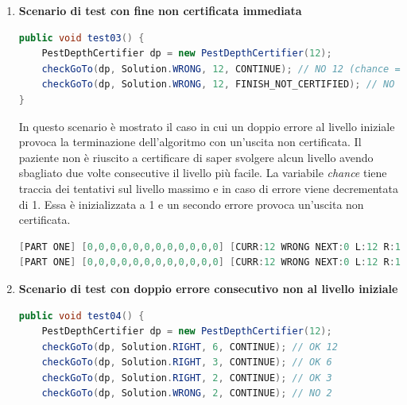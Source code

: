 \documentclass[
	corpo=12pt,
	twoside,
 	evenboxes,
	tipotesi=triennale,
    	stile=classica,
   	 greek,
]{toptesi}
\begin{document}
\begin{enumerate}
\begin{lstlisting}[language=Java, label=lst:debug02, caption={Debug 02}]
[PART ONE] [0,0,0,0,0,0,0,0,0,0,0,1] [CURR:12 RIGHT NEXT:6 L:12 R:1]
[PART ONE] [0,0,0,0,0,1,0,0,0,0,0,1] [CURR:6 RIGHT NEXT:3 L:6 R:1]
[PART ONE] [0,0,1,0,0,1,0,0,0,0,0,1] [CURR:3 RIGHT NEXT:2 L:3 R:1]
[PART ONE] [0,1,1,0,0,1,0,0,0,0,0,1] [CURR:2 RIGHT NEXT:1 L:2 R:1]
[PART TWO] [1,1,1,0,0,1,0,0,0,0,0,1] [CURR:1 RIGHT NEXT:1 L:2 R:1]
[PART TWO] [2,1,1,0,0,1,0,0,0,0,0,1] [CURR:1 RIGHT NEXT:1 L:2 R:1]
\end{lstlisting}

\item \textbf{Scenario di test con fine non certificata immediata}

\begin{lstlisting}[language=Java, label=lst:test03, caption={Test 03}]
public void test03() {
	PestDepthCertifier dp = new PestDepthCertifier(12);
	checkGoTo(dp, Solution.WRONG, 12, CONTINUE); // NO 12 (chance = 0)
	checkGoTo(dp, Solution.WRONG, 12, FINISH_NOT_CERTIFIED); // NO 12, FINISH_NOT_CERTIFIED
}
\end{lstlisting}

In questo scenario è mostrato il caso in cui un doppio errore al livello iniziale provoca la terminazione dell'algoritmo con un'uscita non certificata. Il paziente non è riuscito a certificare di saper svolgere alcun livello avendo sbagliato due volte consecutive il livello più facile. La variabile \textit{chance} tiene traccia dei tentativi sul livello massimo e in caso di errore viene decrementata di 1. Essa è inizializzata a 1 e un secondo errore provoca un’uscita non certificata.

\begin{lstlisting}[language=Java, label=lst:debug03, caption={Debug 03}]
[PART ONE] [0,0,0,0,0,0,0,0,0,0,0,0] [CURR:12 WRONG NEXT:0 L:12 R:1]
[PART ONE] [0,0,0,0,0,0,0,0,0,0,0,0] [CURR:12 WRONG NEXT:0 L:12 R:1]
\end{lstlisting}

\item \textbf{Scenario di test con doppio errore consecutivo non al livello iniziale}

\begin{lstlisting}[language=Java, label=lst:test04, caption={Test 04}]
public void test04() {
	PestDepthCertifier dp = new PestDepthCertifier(12);
	checkGoTo(dp, Solution.RIGHT, 6, CONTINUE); // OK 12
	checkGoTo(dp, Solution.RIGHT, 3, CONTINUE); // OK 6
	checkGoTo(dp, Solution.RIGHT, 2, CONTINUE); // OK 3
	checkGoTo(dp, Solution.WRONG, 2, CONTINUE); // NO 2
	

\end{lstlisting}
\end{enumerate}
\end{document}
